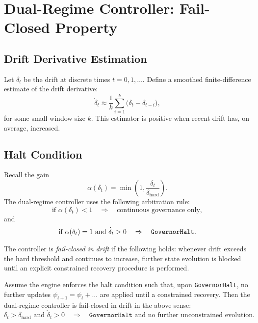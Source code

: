 \documentclass[11pt]{article}
\begin{document}
\section{Dual-Regime Controller: Fail-Closed Property}

\subsection{Drift Derivative Estimation}

Let $\delta_t$ be the drift at discrete times $t = 0,1,\dots$.
Define a smoothed finite-difference estimate of the drift derivative:
\begin{equation}
  \dot{\delta}_t \approx \frac{1}{k} \sum_{i=1}^{k} \big(\delta_t - \delta_{t-i}\big),
\end{equation}
for some small window size $k$.
This estimator is positive when recent drift has, on average, increased.

\subsection{Halt Condition}

Recall the gain
\begin{equation}
  \alpha(\delta_t) = \min\left(1, \frac{\delta_t}{\delta_{\mathrm{hard}}}\right).
\end{equation}
The dual-regime controller uses the following arbitration rule:
\begin{equation}
  \text{if } \alpha(\delta_t) < 1
  \quad\Rightarrow\quad
  \text{continuous governance only},
\end{equation}
and
\begin{equation}
  \text{if } \alpha(\delta_t) = 1 \text{ and } \dot{\delta}_t > 0
  \quad\Rightarrow\quad
  \text{\texttt{GovernorHalt}}.
\end{equation}

\begin{definition}
The controller is \emph{fail-closed in drift} if the following holds: whenever drift exceeds the hard threshold and continues to increase, further state evolution is blocked until an explicit constrained recovery procedure is performed.
\end{definition}

\begin{proposition}
Assume the engine enforces the halt condition such that, upon \texttt{GovernorHalt}, no further updates $\psi_{t+1} = \psi_t + \dots$ are applied until a constrained recovery.
Then the dual-regime controller is fail-closed in drift in the above sense:
\begin{equation}
  \delta_t > \delta_{\mathrm{hard}} \text{ and } \dot{\delta}_t > 0
  \quad\Rightarrow\quad
  \texttt{GovernorHalt} \text{ and no further unconstrained evolution}.
\end{equation}
\end{proposition}
\end{document}
